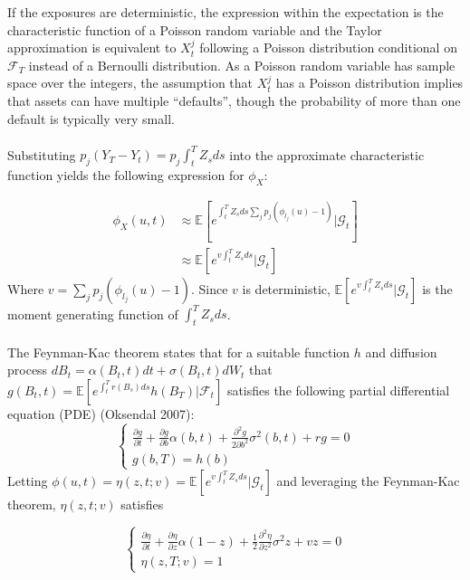 \documentclass[12pt]{article}
\theoremstyle{definition}
\begin{document}
If the exposures are deterministic, the expression within the expectation is the characteristic function of a Poisson random variable and the Taylor approximation is equivalent to \(X_t ^ j\) following a Poisson distribution conditional on \(\mathcal{F}_T\) instead of a Bernoulli distribution.  As a Poisson random variable has sample space over the integers, the assumption that \(X_t ^j\) has a Poisson distribution implies that assets can have multiple ``defaults'', though the probability of more than one default is typically very small.  
\\
\\
Substituting \(p_j (Y_T - Y_t)=p_j\int_t ^T Z_s ds\) into the approximate characteristic function yields the following expression for \(\phi_X\):

\begin{align}\phi_X(u, t) &\approx \mathbb{E}\left[  e^{\int_t ^T Z_s ds\sum_j  p_j\left(\phi_{l_j}(u)-1\right)} |\mathcal{G}_t\right] \\
&\approx \mathbb{E}\left[  e^{v\int_t ^T Z_s ds} |\mathcal{G}_t \right] \end{align}
Where \(v=\sum_j  p_j \left(\phi_{l_j}(u)-1\right)\). Since \(v\) is deterministic, \(\mathbb{E}\left[  e^{v\int_t ^T Z_s ds} |\mathcal{G}_t \right]\) is the moment generating function of \(\int_t ^T Z_s ds\).  
\\
\\
The Feynman-Kac theorem states that for a suitable function \(h\) and diffusion process \(dB_t=\alpha(B_t, t)dt+\sigma(B_t, t)dW_t\) that
\(g(B_t, t)=\mathbb{E}\left[e^{\int_t ^T r(B_s)ds}h(B_T)|\mathcal{F}_t\right]\) satisfies the following partial differential equation (PDE) (Oksendal 2007):
\begin{equation}
\begin{cases} \frac{\partial g}{\partial t}+\frac{\partial g}{\partial b}\alpha(b, t)+\frac{\partial ^2 g}{2\partial b^2}\sigma^2 (b, t)+rg=0 \\
g(b, T)=h(b) \end{cases}
\end{equation}
Letting \(\phi(u, t) =\eta(z, t; v)=\mathbb{E}\left[  e^{v\int_t ^T Z_s ds} |\mathcal{G}_t \right]\) and leveraging the Feynman-Kac theorem,
\(\eta(z, t; v)\) satisfies

\begin{equation}
\begin{cases}\frac{\partial \eta}{\partial t}+\frac{\partial\eta}{\partial z}\alpha(1-z)+\frac{1}{2}\frac{\partial ^2 \eta}{\partial z^2} \sigma^2 z+vz=0 \\
\eta( z, T; v)=1\end{cases}
\end{equation}
\end{document}
